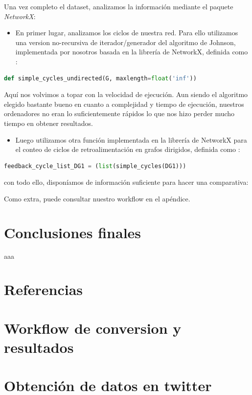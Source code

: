 \documentclass[1p]{elsarticle}
\begin{document}
Una vez completo el dataset, analizamos la información mediante el paquete  \textit{NetworkX}:
\begin{itemize}
	\item En primer lugar, analizamos  los ciclos de nuestra red. Para ello utilizamos una version no-recursiva de iterador/generador del algoritmo de Johnson, implementada por nosotros basada en la librería de NetworkX, definida como :
\end{itemize}

	\begin{lstlisting}[language=Python]
	def simple_cycles_undirected(G, maxlength=float('inf'))\end{lstlisting}
Aquí nos volvimos a topar con la velocidad de ejecución. Aun siendo el algoritmo elegido bastante bueno en cuanto a complejidad y tiempo de ejecución, nuestros ordenadores no eran lo suficientemente rápidos lo que nos hizo perder mucho tiempo en obtener resultados.
\begin{itemize}
	\item Luego utilizamos otra función implementada en la librería de NetworkX para el conteo de ciclos de retroalimentación en grafos dirigidos, definida como :
\end{itemize}


\begin{lstlisting}[language=Python]
feedback_cycle_list_DG1 = (list(simple_cycles(DG1)))\end{lstlisting}
 
con todo ello, disponíamos de información suficiente para hacer una comparativa:



Como extra, puede consultar nuestro workflow en el apéndice.



\section{Conclusiones finales}
aaa



\section*{Referencias}


\begin{appendices}
	
	\section{Workflow de conversion y resultados}
	
\section{Obtención de datos en twitter}

\end{appendices}
\end{document}
